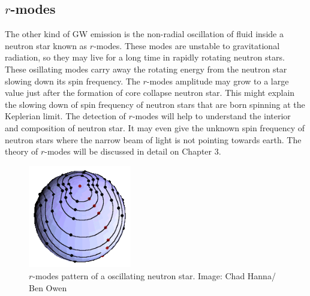 \documentclass{ttuthes2007}
\begin{document}
\subsection{$r$-modes}
The other kind of \ac{GW} emission is the non-radial oscillation of fluid
inside a neutron star known as $r$-modes. These modes are unstable to
gravitational radiation, so they may live for a long time in rapidly rotating neutron
stars. These osillating modes carry away the rotating energy from the neutron star
slowing down its spin frequency. The $r$-modes amplitude may grow to a large value just
after the formation of core collapse neutron star. This might explain the
slowing down of spin frequency of neutron stars that are born spinning at the Keplerian
limit. The detection of $r$-modes will help to
understand the interior and composition of neutron star. It may even give the
unknown spin frequency of neutron stars where the narrow beam of light is not
pointing towards earth. The theory of $r$-modes will be discussed in detail on
Chapter 3.
\begin{figure}
\centering
	\includegraphics[width=0.4\textwidth]{figure/333.png}
	\caption{$r$-modes pattern of a oscillating neutron star. Image: Chad
Hanna/ Ben Owen}
\end{figure}
\end{document}
